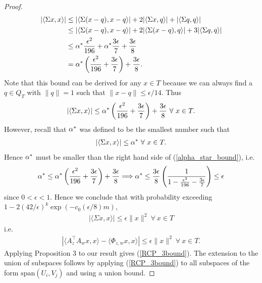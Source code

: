 \documentclass{article}
\begin{document}
\begin{proof}
\begin{align*}
|\langle \Sigma x,x \rangle| & \leq |\langle \Sigma(x-q),x-q\rangle| + 2|\langle \Sigma x,q\rangle| + |\langle \Sigma q,q\rangle| \\
& \leq |\langle \Sigma(x-q),x-q\rangle| + 2|\langle \Sigma (x-q),q\rangle| + 3|\langle \Sigma q,q\rangle| \\
& \leq \alpha^* \frac{\epsilon^2}{196} + \alpha^*\frac{3\epsilon}{7} + \frac{3\epsilon}{8} \\
& = \alpha^*\left(\frac{\epsilon^2}{196} + \frac{3\epsilon}{7}\right) + \frac{3\epsilon}{8}.
\end{align*} Note that this bound can be derived for any $x \in T$ because we can always find a $q \in Q_T$ with $\|q \| = 1$ such that $\|x - q\| \leq \epsilon/14.$ Thus \begin{align}
|\langle \Sigma x,x \rangle| \leq \alpha^*\left(\frac{\epsilon^2}{196} + \frac{3\epsilon}{7}\right) + \frac{3\epsilon}{8}\ \forall\ x \in T. \label{alpha_star_bound}
\end{align} However, recall that $\alpha^*$ was defined to be the smallest number such that \begin{align*}
|\langle \Sigma x,x \rangle| \leq \alpha^*\ \forall\ x \in T.
\end{align*} Hence $\alpha^*$ must be smaller than the right hand side of (\ref{alpha_star_bound}), i.e. \begin{align*}
\alpha^* \leq \alpha^*\left(\frac{\epsilon^2}{196} + \frac{3\epsilon}{7}\right) + \frac{3\epsilon}{8} \Longrightarrow \alpha^* \leq \frac{3\epsilon}{8}\left(\frac{1}{1 - \frac{\epsilon^2}{196} - \frac{3\epsilon}{7}}\right) \leq \epsilon
\end{align*} since $0 < \epsilon < 1$. Hence we conclude that with probability exceeding $1 - 2(42/\epsilon)^k\exp(-c_0(\epsilon/8)m)$, \begin{align*}
|\langle \Sigma x,x \rangle| \leq \epsilon \|x\|^2\ \forall\ x \in T
\end{align*} i.e. \begin{align*}
|\langle A_z^\top A_w x, x\rangle - \langle \Phi_{z,w} x,x \rangle| \leq \epsilon \|x\|^2\ \forall\ x \in T.
\end{align*} Applying Proposition 3 to our result gives (\ref{RCP_3bound}). The extension to the union of subspaces follows by applying (\ref{RCP_3bound}) to all subspaces of the form $\text{span}(U_i,V_j)$ and using a union bound.

\end{proof}
\end{document}
